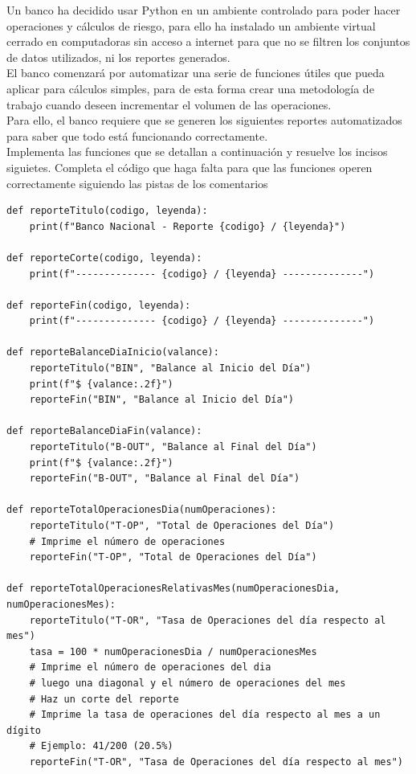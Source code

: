\documentclass{article}
\begin{document}
Un banco ha decidido usar Python en un ambiente controlado para poder hacer operaciones y cálculos de riesgo, para ello ha instalado un ambiente virtual cerrado en computadoras sin acceso a internet para que no se filtren los conjuntos de datos utilizados, ni los reportes generados.
\\[12pt]
El banco comenzará por automatizar una serie de funciones útiles que pueda aplicar para cálculos simples, para de esta forma crear una metodología de trabajo cuando deseen incrementar el volumen de las operaciones.
\\[12pt]
Para ello, el banco requiere que se generen los siguientes reportes automatizados para saber que todo está funcionando correctamente.
\\[12pt]
Implementa las funciones que se detallan a continuación y resuelve los incisos siguietes. Completa el código que haga falta para que las funciones operen correctamente siguiendo las pistas de los comentarios
\scriptsize
\begin{verbatim}
def reporteTitulo(codigo, leyenda):
    print(f"Banco Nacional - Reporte {codigo} / {leyenda}")

def reporteCorte(codigo, leyenda):
    print(f"-------------- {codigo} / {leyenda} --------------")

def reporteFin(codigo, leyenda):
    print(f"-------------- {codigo} / {leyenda} --------------")

def reporteBalanceDiaInicio(valance):
    reporteTitulo("BIN", "Balance al Inicio del Día")
    print(f"$ {valance:.2f}")
    reporteFin("BIN", "Balance al Inicio del Día")

def reporteBalanceDiaFin(valance):
    reporteTitulo("B-OUT", "Balance al Final del Día")
    print(f"$ {valance:.2f}")
    reporteFin("B-OUT", "Balance al Final del Día")

def reporteTotalOperacionesDia(numOperaciones):
    reporteTitulo("T-OP", "Total de Operaciones del Día")
    # Imprime el número de operaciones
    reporteFin("T-OP", "Total de Operaciones del Día")

def reporteTotalOperacionesRelativasMes(numOperacionesDia, numOperacionesMes):
    reporteTitulo("T-OR", "Tasa de Operaciones del día respecto al mes")
    tasa = 100 * numOperacionesDia / numOperacionesMes
    # Imprime el número de operaciones del dia
    # luego una diagonal y el número de operaciones del mes
    # Haz un corte del reporte
    # Imprime la tasa de operaciones del día respecto al mes a un dígito
    # Ejemplo: 41/200 (20.5%)
    reporteFin("T-OR", "Tasa de Operaciones del día respecto al mes")
\end{verbatim}
\hfill
\normalsize
\end{document}
